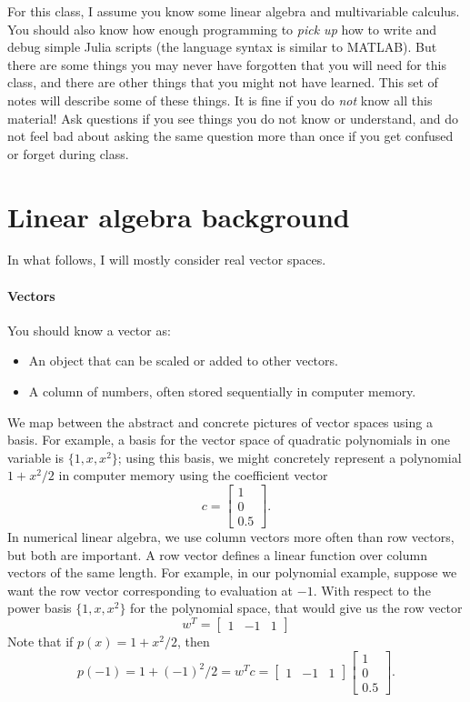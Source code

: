 \documentclass[12pt, leqno]{article}
\begin{document}

For this class, I assume you know some linear algebra and
multivariable calculus.  You should also know how enough programming
to {\em pick up} how to write and debug simple Julia scripts (the
language syntax is similar to MATLAB).
But there are some things you may never have forgotten that you
will need for this class, and there are other things that you might
not have learned.  This set of notes will describe some of these things.
It is fine if you do {\em not} know all this material!  Ask questions
if you see things you do not know or understand, and do not feel bad
about asking the same question more than once if you get confused or
forget during class.

\section{Linear algebra background}

In what follows, I will mostly consider real vector spaces.

\paragraph{Vectors}
You should know a vector as:
\begin{itemize}
\item An object that can be scaled or added to other vectors.
\item A column of numbers, often stored sequentially
  in computer memory.
\end{itemize}
We map between the abstract and concrete pictures of vector spaces
using a basis.  For example, a basis for the vector space of quadratic
polynomials in one variable is $\{1, x, x^2\}$; using this basis, we
might concretely represent a polynomial $1 + x^2/2$ in computer memory
using the coefficient vector
\[
  c = \begin{bmatrix} 1 \\ 0 \\ 0.5 \end{bmatrix}.
\]
In numerical linear algebra, we use column vectors more often than
row vectors, but both are important.  A row vector defines a linear
function over column vectors of the same length.  For example,
in our polynomial example, suppose we want the row vector
corresponding to evaluation at $-1$.  With respect to the power basis
$\{1, x, x^2\}$ for the polynomial space, that would give us the
row vector
\[
  w^T = \begin{bmatrix} 1 & -1 & 1 \end{bmatrix}
\]
Note that if $p(x) = 1+x^2/2$, then
\[
  p(-1) = 1 + (-1)^2/2
  = w^T c
  = \begin{bmatrix} 1 & -1 & 1 \end{bmatrix}
    \begin{bmatrix} 1 \\ 0 \\ 0.5 \end{bmatrix}.
\]
\end{document}
